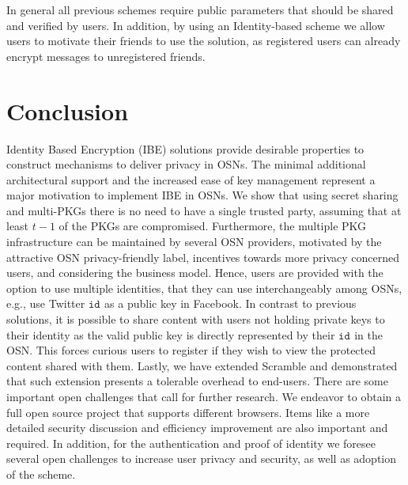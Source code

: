 \documentclass{llncs}
\newcommand{\id}[1]{\ensuremath{\mathtt{id}_{#1}}}
\begin{document}
In general all previous schemes require public parameters that should be shared and verified by users. In addition, by using an Identity-based scheme we allow users to motivate their friends to use the solution, as registered users can already encrypt messages to unregistered friends.



\section{Conclusion}\label{sec:conc}

Identity Based Encryption (IBE) solutions provide desirable properties to construct mechanisms to deliver privacy in OSNs. The minimal
additional architectural support and the increased ease of key management represent a major motivation to implement IBE in OSNs. We show that using secret sharing and multi-PKGs there is no need to have a single trusted party, assuming that at least $t-1$ of the PKGs are compromised. 
Furthermore, the multiple PKG infrastructure can be maintained by several OSN providers, motivated by the attractive OSN privacy-friendly label, incentives towards more privacy concerned users, and considering the business model. 
Hence, users are provided with the option to use multiple identities, that they can use interchangeably among OSNs, e.g., use Twitter \id{} as a public key in Facebook. 
In contrast to previous solutions, it is possible to share content with users not holding private keys to their identity as the valid public key is directly represented by their \id{} in the OSN. This forces curious users to register if they wish to view the protected content shared with them.
Lastly, we have extended Scramble and demonstrated that such extension presents a tolerable overhead to end-users. 
There are some important open challenges that call for further research. We endeavor to obtain a full open source project that supports different browsers. Items like a more detailed security discussion and efficiency improvement are also important and required. In addition, for the authentication and proof of identity we foresee several open challenges to increase user privacy and security, as well as adoption of the scheme.



\end{document}
